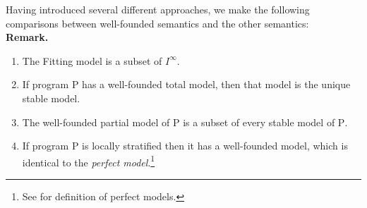 Having introduced several different approaches, we make the following comparisons between well-founded semantics and the other semantics:
\medskip\\
\textbf{Remark.}
\begin{enumerate}[label=(\alph*)]
%
\item The Fitting model is a subset of $I^\infty$.
%
\item If program $\mathrm{P}$ has a well-founded total model, then that model is the unique stable model.
%
\item The well-founded partial model of $\mathrm{P}$ is a subset of every stable model of $\mathrm{P}$.
%
\item If program $\mathrm{P}$ is locally stratified then it has a well-founded model, which is identical to the \emph{perfect model}.\footnote{See \cite{prz} for definition of perfect models.}
%
\end{enumerate}